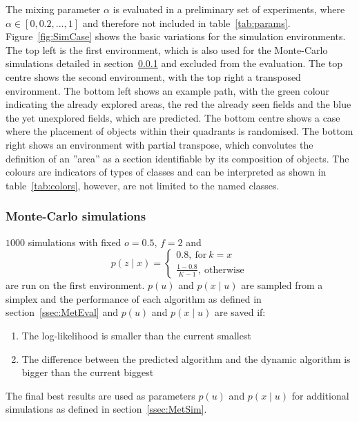 \documentclass[twocolumn,letterpaper]{IEEEAerospaceCLS}  %
\begin{document}
The mixing parameter $\alpha$ is evaluated in a preliminary set of experiments, where $\alpha \in [0, 0.2, ..., 1]$ and therefore not included in table~\ref{tab:params}.
Figure~\ref{fig:SimCase} shows the basic variations for the simulation environments. The top left is the first environment, which is also used for the Monte-Carlo simulations detailed in section~\ref{ssec:MetMC} and excluded from the evaluation. The top centre shows the second environment, with the top right a transposed environment. The bottom left shows an example path, with the green colour indicating the already explored areas, the red the already seen fields and the blue the yet unexplored fields, which are predicted. The bottom centre shows a case where the placement of objects within their quadrants is randomised. The bottom right shows an environment with partial transpose, which convolutes the definition of an ''area'' as a section identifiable by its composition of objects. The colours are indicators of types of classes and can be interpreted as shown in table~\ref{tab:colors}, however, are not limited to the named classes.
\subsubsection{Monte-Carlo simulations} \label{ssec:MetMC}
$1000$ simulations with fixed $o=0.5$, $f=2$ and
\begin{equation} \nonumber
    p(z\mid x)=
    \begin{cases}
        0.8,~\text{for}~k=x \\
        \frac{1-0.8}{K-1},~\text{otherwise}
    \end{cases}
\end{equation}
are run on the first environment. $p(u)$ and $p(x\mid u)$ are sampled from a simplex and the performance of each algorithm as defined in section~\ref{ssec:MetEval} and $p(u)$ and $p(x\mid u)$ are saved if:
\begin{enumerate}
    \item The log-likelihood is smaller than the current smallest
    \item The difference between the predicted algorithm and the dynamic algorithm is bigger than the current biggest
\end{enumerate}
The final best results are used as parameters $p(u)$ and $p(x\mid u)$ for additional simulations as defined in section~\ref{ssec:MetSim}.
\end{document}

